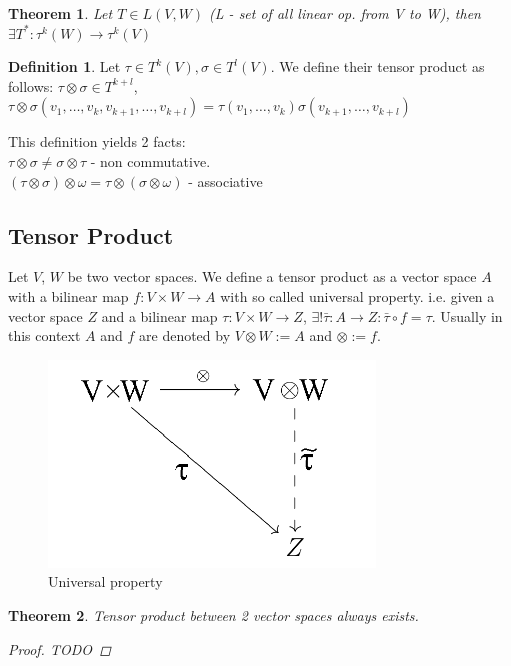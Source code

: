 \documentclass[a4paper, 11pt]{article}
\newtheorem{theorem}{Theorem}
\theoremstyle{definition}
\newtheorem{definition}{Definition}[section]
\begin{document}
\begin{theorem}
	Let $T \in L(V, W)$ (L - set of all linear op. from V to W), then
	$\exists T^*: \tau^k(W) \rightarrow \tau^k(V)$
\end{theorem}

\begin{definition}
	Let $\tau \in T^k(V), \sigma \in T^l(V)$. We define their tensor product as follows:
	$\tau \otimes \sigma \in T^{k+l}$,  \\
	$\tau \otimes \sigma(v_1, \dots, v_k, v_{k+1}, \dots, v_{k+l}) = \tau(v_1, \dots, v_k)\sigma(v_{k+1}, \dots, v_{k+l})$
\end{definition}

This definition yields 2 facts: \\
$\tau \otimes \sigma \neq \sigma \otimes \tau$ - non commutative. \\
$(\tau \otimes \sigma) \otimes \omega = \tau \otimes (\sigma \otimes \omega)$ - associative

\subsection{Tensor Product}
Let $V$, $W$ be two vector spaces. We define a tensor product as a vector space $A$ with a bilinear map $f: V \times W \rightarrow A$ with so called universal property. i.e. given a vector space $Z$ and a bilinear map $\tau: V \times W \rightarrow Z$, $\exists! \bar{\tau}: A \rightarrow Z: \bar{\tau} \circ f = \tau$. Usually in this context $A$ and $f$ are denoted by $V \otimes W := A$ and $\otimes := f$.
\begin{figure}[h]
\includegraphics{universal_property}
\caption{Universal property}
\end{figure}

\begin{theorem}
	Tensor product between 2 vector spaces always exists.
	\begin{proof}
		TODO
	\end{proof}
\end{theorem}
\end{document}
